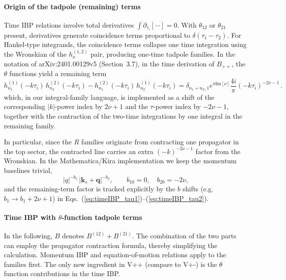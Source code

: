 \documentclass[a4paper,12pt]{article}
\def\bge{\begin{equation}}
\def\ede{\end{equation}}
\def\pd{\partial}
\def\to{\rightarrow}
\begin{document}
\paragraph{Origin of the tadpole (remaining) terms}
Time IBP relations involve total derivatives $\int \pd_{\tau_i}[\cdots]=0$. With $\theta_{12}$ or $\theta_{21}$ present, derivatives generate coincidence terms proportional to $\delta(\tau_1-\tau_2)$. For Hankel-type integrands, the coincidence terms collapse one time integration using the Wronskian of the $h^{(1,2)}_\nu$ pair, producing one-time tadpole families. In the notation of arXiv:2401.00129v5 (Section~3.7), in the time derivation of   $B_{++}$,  the $\theta$ functions yield a remaining term 
\bge
h_{n_1}^{(1)}(-k\tau_i)\,h_{n_2}^{(2)}(-k\tau_i) - h_{n_1}^{(2)}(-k\tau_i)\,h_{n_2}^{(1)}(-k\tau_i)
= \delta_{n_1+ n_2,1}e^{ \pi \text{Im}[\nu]} \frac{  4 i }{\pi}  (-k\tau_i)^{-2\nu-1} \,  .  \label{eq_propcontract}
\ede
which, in our integral-family language, is implemented as a shift of the corresponding $|k|$-power index by $2\nu+1$ and the $\tau$-power index by $-2\nu-1$,  together with the contraction of the two-time integrations by one integral in the remaining family.

In particular, since the $R$ families originate from contracting one propagator in the top sector, the contracted line carries an extra $(-k)^{-2\nu-1}$ factor from the Wronskian. In the Mathematica/Kira implementation we keep the momentum baselines trivial,
\[
|q|^{-b_1}\,|\bm k_s+\bm q|^{-b_2},
\qquad b_{10}=0, \quad b_{20}=-2\nu,
\]
and the remaining-term factor is tracked explicitly by the $b$ shifts (e.g. $b_1\to b_1+2\nu+1$) in Eqs.~(\ref{eq:timeIBP_tau1})--(\ref{eq:timeIBP_tau2}).


\paragraph{Time IBP with $\theta$-function tadpole terms}
In the following, $B$ denotes $B^{(12)}+B^{(21)}$. The combination of the two parts can employ the propagator contraction formula, thereby simplifying the calculation. Momentum IBP and equation-of-motion relations apply to the families first. The only new ingredient in V++ (compare to V+-) is the $\theta$ function contributions in the time IBP.
\end{document}
